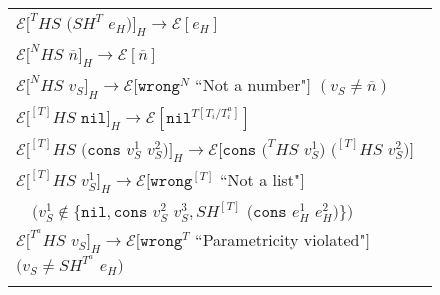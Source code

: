 \begin{figure}[p]
\centering
\begin{tabular}{l}
\vspace{5pt}

$\mathscr{E}[^{T}HS$ $(SH^{T}$ $e_{H})]_{H}\rightarrow\mathscr{E}[e_{H}]$ \\

\vspace{5pt}

$\mathscr{E}[^{N}HS$ $\overline{n}]_{H}\rightarrow\mathscr{E}[\overline{n}]$ \\

\vspace{5pt}

$\mathscr{E}[^{N}HS$ $v_{S}]_{H}\rightarrow\mathscr{E}[\mathtt{wrong}^{N}$ ``Not a number"$]$ $(v_{S}\neq\overline{n})$ \\

\vspace{5pt}

$\mathscr{E}[^{[T]}HS$ $\mathtt{nil}]_{H}\rightarrow\mathscr{E}[\mathtt{nil}^{T[T_{i}/T_{i}^{a}]}]$ \\

\vspace{5pt}

$\mathscr{E}[^{[T]}HS$ $(\mathtt{cons}$ $v_{S}^{1}$ $v_{S}^{2})]_{H}\rightarrow\mathscr{E}[\mathtt{cons}$ $(^{T}HS$ $v_{S}^{1})$ $(^{[T]}HS$ $v_{S}^{2})]$ \\

\vspace{5pt}

$\mathscr{E}[^{[T]}HS$ $v_{S}^{1}]_{H}\rightarrow\mathscr{E}[\mathtt{wrong}^{[T]}$ ``Not a list"$]$ \\

\vspace{5pt}

$\quad(v_{S}^{1}\not\in\lbrace\mathtt{nil},\mathtt{cons}$ $v_{S}^{2}$ $v_{S}^{3},SH^{[T]}$ $(\mathtt{cons}$ $e_{H}^{1}$ $e_{H}^{2})\rbrace)$ \\

\vspace{5pt}

$\mathscr{E}[^{T^{a}}HS$ $v_{S}]_{H}\rightarrow\mathscr{E}[\mathtt{wrong}^{T}$ ``Parametricity violated"$]$ $(v_{S}\neq SH^{T^{a}}$ $e_{H})$ \\

\vspace{5pt}


\end{tabular}
\end{figure}
